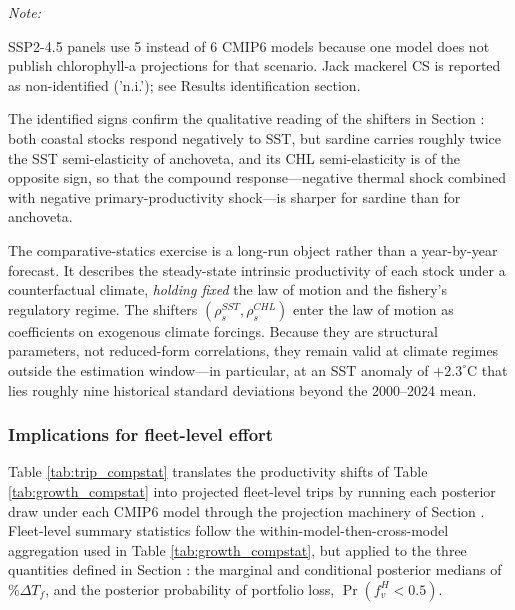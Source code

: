 \documentclass[
  11pt,
]{article}
\begin{document}
\begin{landscape}
\begin{table}[!h]
{\begin{threeparttable}
\begin{tabular}[t]{llccccccr}
\bottomrule
\end{tabular}
\begin{tablenotes}
\item \textit{Note:} 
\item SSP2-4.5 panels use 5 instead of 6 CMIP6 models because one model does not publish chlorophyll-a projections for that scenario. Jack mackerel CS is reported as non-identified ('n.i.'); see Results identification section.
\end{tablenotes}
\end{threeparttable}}
\end{table}
\end{landscape}

The identified signs confirm the qualitative reading of the shifters in Section \emph{}: both coastal stocks respond negatively to SST, but sardine carries roughly twice the SST semi-elasticity of anchoveta, and its CHL semi-elasticity is of the opposite sign, so that the compound response---negative thermal shock combined with negative primary-productivity shock---is sharper for sardine than for anchoveta.

The comparative-statics exercise is a long-run object rather than a year-by-year forecast. It describes the steady-state intrinsic productivity of each stock under a counterfactual climate, \emph{holding fixed} the law of motion and the fishery's regulatory regime. The shifters \((\rho_s^{SST}, \rho_s^{CHL})\) enter the law of motion as coefficients on exogenous climate forcings. Because they are structural parameters, not reduced-form correlations, they remain valid at climate regimes outside the estimation window---in particular, at an SST anomaly of \(+2.3^{\circ}\)C that lies roughly nine historical standard deviations beyond the 2000--2024 mean.

\subsubsection{Implications for fleet-level effort}\label{implications-for-fleet-level-effort}

Table \ref{tab:trip_compstat} translates the productivity shifts of Table \ref{tab:growth_compstat} into projected fleet-level trips by running each posterior draw under each CMIP6 model through the projection machinery of Section \emph{}. Fleet-level summary statistics follow the within-model-then-cross-model aggregation used in Table \ref{tab:growth_compstat}, but applied to the three quantities defined in Section \emph{}: the marginal and conditional posterior medians of \(\%\Delta T_f\), and the posterior probability of portfolio loss, \(\Pr(f^H_v<0.5)\).
\end{document}
